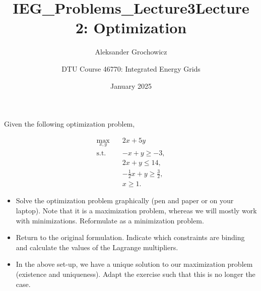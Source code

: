 \documentclass[10pt]{article}
\title{IEG_Problems_Lecture3}
\author{Aleksander Grochowicz}
\date{January 2025}
\newenvironment{problem}[2][Problem]{\begin{trivlist}
\item[\hskip \labelsep {\bfseries #1}\hskip \labelsep {\bfseries #2.}]}{\end{trivlist}}
\begin{document}
 
\title{\textbf{Lecture 2: Optimization}}
\author{
DTU Course 46770: Integrated Energy Grids }
\maketitle
\begin{problem}{2.1}

Given the following optimization problem,


\begin{align*}
	\max_{x,y} \quad & 2x + 5y \\
	\text{s.t.} \quad & -x + y \geq -3, \\
	& 2x + y \leq 14, \\
	& -\frac{1}{2}x + y \geq \frac{3}{2}, \\
	& x \geq 1.
\end{align*}



\begin{itemize}
\item[a)] Solve the optimization problem graphically (pen and paper or on your laptop). Note that it is a maximization problem, whereas we will mostly work with minimizations. Reformulate as a minimization problem.
\item[b)] Return to the original formulation. Indicate which constraints are binding and calculate the values of the Lagrange multipliers.
\item[c)] In the above set-up, we have a unique solution to our maximization problem (existence and uniqueness). Adapt the exercise such that this is no longer the case.
\end{itemize}
\end{problem}

\
\end{document}
